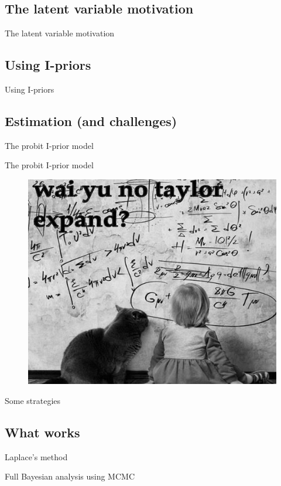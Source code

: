 \subsection{The latent variable motivation}
\begin{frame}{The latent variable motivation}
\end{frame}
\subsection{Using I-priors}
\begin{frame}{Using I-priors}
\end{frame}
\subsection{Estimation (and challenges)}
\begin{frame}{The probit I-prior model}
\end{frame}
\begin{frame}{The probit I-prior model}
\end{frame}
\begin{frame}
  \vspace*{\fill}
  \begin{figure}[hbt]
    \includegraphics[scale=0.5]{figure/taylor_expand_meme}
  \end{figure}
  \vspace*{\fill}
\end{frame}
\begin{frame}{Some strategies}
\end{frame}
\subsection{What works}
\begin{frame}{Laplace's method}
\end{frame}
\begin{frame}{Full Bayesian analysis using MCMC}
\end{frame}